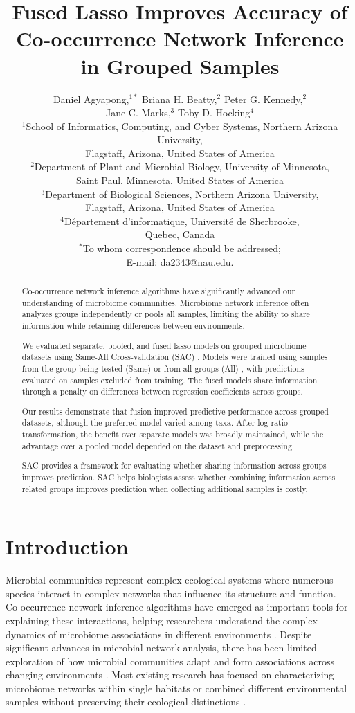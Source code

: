 \documentclass[]{Liebert_Author_revised}
\title{Fused Lasso Improves Accuracy of Co-occurrence Network Inference in Grouped Samples}
\author{\parbox{\dimexpr\textwidth-2\tabcolsep\relax}{\centering Daniel Agyapong,$^{1\ast}$ Briana H. Beatty,$^{2}$ Peter G. Kennedy,$^{2}$\\ 
Jane C. Marks,$^{3}$ Toby D. Hocking$^{4}$\\
{$^{1}$School of Informatics, Computing, and Cyber Systems, Northern Arizona University,}\\
{Flagstaff, Arizona, United States of America}\\
{$^{2}$Department of Plant and Microbial Biology, University of Minnesota,}\\
{Saint Paul, Minnesota, United States of America}\\
{$^{3}$Department of Biological Sciences, Northern Arizona University,}\\
{Flagstaff, Arizona, United States of America}\\
{$^{4}$Département d'informatique, Université de Sherbrooke,}\\
{Quebec, Canada}\\
{$^\ast$To whom correspondence should be addressed;}\\
{E-mail: da2343@nau.edu.}}
}
\date{}
\providecommand{\DIFadd}[1]{{\ifmmode\else\leavevmode\fi\color{blue}#1}} %
\providecommand{\DIFaddbegin}{} %
\providecommand{\DIFaddend}{} %
\begin{document}
\maketitle

\begin{abstract}
Co-occurrence network inference algorithms have significantly advanced our understanding of microbiome communities.  \DIFaddbegin \DIFadd{Microbiome network inference often analyzes groups independently or pools all samples, limiting the ability to share information while retaining differences between environments.
}\DIFaddend 

 \DIFaddbegin \DIFadd{We evaluated separate, pooled, and fused lasso models on grouped microbiome datasets using }\DIFaddend Same-All Cross-validation (SAC) \DIFaddbegin \DIFadd{. Models were trained using samples from the group being tested }\DIFaddend (Same)  \DIFaddbegin \DIFadd{or from all groups }\DIFaddend (All) \DIFaddbegin \DIFadd{, with predictions evaluated on samples excluded from training. The fused models share information through a penalty on differences between regression coefficients across groups.
}\DIFaddend 

 \DIFaddbegin \DIFadd{Our results demonstrate that fusion improved predictive performance across grouped datasets, although the preferred model varied among taxa. After log ratio transformation, the benefit over separate models was broadly maintained, while the advantage over a pooled model depended on the dataset and preprocessing.
}

\DIFadd{SAC provides a framework for evaluating whether sharing information across groups improves prediction. SAC helps biologists assess whether combining information across related groups improves prediction when collecting additional samples is costly.
}\DIFaddend \end{abstract}
\DIFaddbegin {}
\DIFaddend 

\section{Introduction}
Microbial communities represent complex ecological systems where numerous species interact in complex networks that influence its structure and function.
Co-occurrence network inference algorithms have emerged as important tools for explaining these interactions, helping researchers understand the complex dynamics of microbiome associations in different environments \citep{faust2012microbial,lima2015determinants}.
Despite significant advances in microbial network analysis, there has been limited exploration of how microbial communities adapt and form associations across changing environments \citep{baldo2017convergence}.
Most existing research has focused on characterizing microbiome networks within single habitats or combined different environmental samples without preserving their ecological distinctions \citep{weiss2016correlation}.
\end{document}
